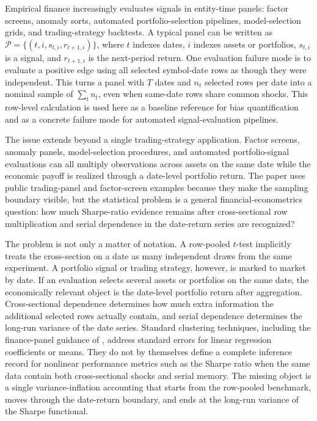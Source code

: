 \documentclass[12pt,a4paper]{article}
\begin{document}
Empirical finance increasingly evaluates signals in entity-time panels:
factor screens, anomaly sorts, automated portfolio-selection pipelines,
model-selection grids, and trading-strategy backtests.  A typical panel
can be written as
\(\mathcal P=\{(t,i,s_{t,i},r_{t+1,i})\}\), where \(t\) indexes dates,
\(i\) indexes assets or portfolios, \(s_{t,i}\) is a signal, and
\(r_{t+1,i}\) is the next-period return.  One evaluation failure mode is
to evaluate a positive edge using all selected symbol-date rows as
though they were independent.  This turns a panel with \(T\) dates and
\(n_t\) selected rows per date into a nominal sample of \(\sum_t n_t\),
even when same-date rows share common shocks.  This row-level
calculation is used here as a baseline reference for bias quantification
and as a concrete failure mode for automated signal-evaluation
pipelines.

The issue extends beyond a single trading-strategy application.  Factor
screens, anomaly panels, model-selection procedures, and automated
portfolio-signal evaluations can all multiply observations across
assets on the same date while the economic payoff is realized through a
date-level portfolio return.  The paper uses public trading-panel and
factor-screen examples because they make the sampling boundary visible,
but the statistical problem is a general financial-econometrics question:
how much Sharpe-ratio evidence remains after cross-sectional row
multiplication and serial dependence in the date-return series are
recognized?

The problem is not only a matter of notation.  A row-pooled \(t\)-test
implicitly treats the cross-section on a date as many independent draws
from the same experiment.  A portfolio signal or trading strategy,
however, is marked to market by date.  If an evaluation selects several
assets or portfolios on the same date, the economically relevant object
is the date-level portfolio return after aggregation.  Cross-sectional
dependence determines how much extra information the additional selected
rows actually contain, and serial dependence determines the long-run
variance of the date series.
Standard clustering techniques, including the finance-panel guidance of
\citet{petersen2009estimating}, address standard errors for linear
regression coefficients or means.  They do not by themselves define a
complete inference record for nonlinear performance metrics such as the
Sharpe ratio when the same data contain both cross-sectional shocks and
serial memory.  The missing object is a single variance-inflation
accounting that starts from the row-pooled benchmark, moves through the
date-return boundary, and ends at the long-run variance of the Sharpe
functional.
\end{document}
